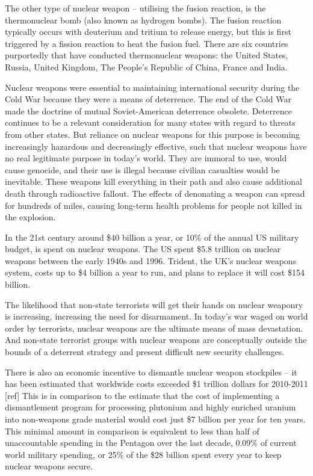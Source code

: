 \documentclass[twocolumn,a4paper]{article}
\begin{document}
The other type of nuclear weapon -- utilising the fusion reaction, is 
the thermonuclear bomb (also known as hydrogen bombs).  The fusion 
reaction typically occurs with deuterium and tritium to release energy, 
but this is first triggered by a fission reaction to heat the fusion fuel. 
There are six countries purportedly that have conducted thermonuclear 
weapons: the United States, Russia, United Kingdom, The People's Republic 
of China, France and India.

Nuclear weapons were essential to maintaining international security during 
the Cold War because they were a means of deterrence. The end of the Cold 
War made the doctrine of mutual Soviet-American deterrence obsolete. 
Deterrence continues to be a relevant consideration for many states with 
regard to threats from other states. But reliance on nuclear weapons for 
this purpose is becoming increasingly hazardous and decreasingly effective, 
such that nuclear weapons have no real legitimate purpose in today’s world. 
They are immoral to use, would cause genocide, and their use is illegal because 
civilian casualties would be inevitable. These weapons kill everything in their 
path and also cause additional death through radioactive fallout. The effects 
of denonating a weapon can spread for hundreds of miles, causing long-term 
health problems for people not killed in the explosion. 

In the 21st century around \$40 billion a year, or 10\% of the annual US 
military budget, is spent on nuclear weapons. The US spent \$5.8 trillion on 
nuclear weapons between the early 1940s and 1996. Trident, the UK’s nuclear 
weapons system, costs up to \$4 billion a year to run, and plans to replace 
it will cost \$154 billion.

The likelihood that non-state terrorists will get their hands on nuclear 
weaponry is increasing, increasing the need for disarmament. In today's war 
waged on world order by terrorists, nuclear weapons are the ultimate means of 
mass devastation. And non-state terrorist groups with nuclear weapons are 
conceptually outside the bounds of a deterrent strategy and present difficult 
new security challenges.

There is also an economic incentive to dismantle nuclear weapon stockpiles -- 
it has been estimated that worldwide costs exceeded \$1 trillion dollars for 
2010-2011 [ref]
This is in comparison to the estimate that the cost of implementing a 
dismantlement program for processing plutonium and highly enriched uranium 
into non-weapons grade material would cost just \$7 billion per year for ten 
years. This minimal amount in comparison is equivalent to less than half of 
unaccountable spending in the Pentagon over the last decade, 0.09\% of current 
world military spending, or 25\% of the \$28 billion spent every year to keep 
nuclear weapons secure.
\end{document}
